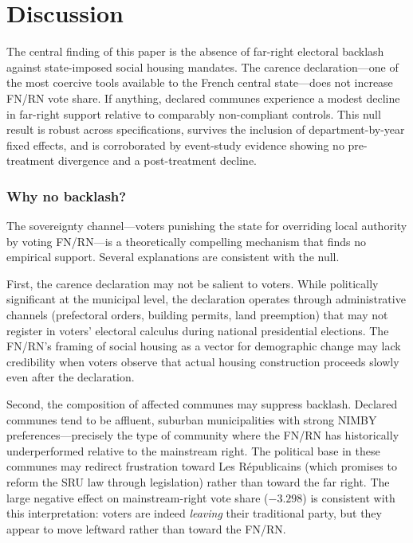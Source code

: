 \documentclass[12pt]{article}
\begin{document}
\section{Discussion}

The central finding of this paper is the absence of far-right electoral backlash against state-imposed social housing mandates. The carence declaration---one of the most coercive tools available to the French central state---does not increase FN/RN vote share. If anything, declared communes experience a modest decline in far-right support relative to comparably non-compliant controls. This null result is robust across specifications, survives the inclusion of department-by-year fixed effects, and is corroborated by event-study evidence showing no pre-treatment divergence and a post-treatment decline.

\subsubsection*{Why no backlash?} The sovereignty channel---voters punishing the state for overriding local authority by voting FN/RN---is a theoretically compelling mechanism that finds no empirical support. Several explanations are consistent with the null.

First, the carence declaration may not be salient to voters. While politically significant at the municipal level, the declaration operates through administrative channels (prefectoral orders, building permits, land preemption) that may not register in voters' electoral calculus during national presidential elections. The FN/RN's framing of social housing as a vector for demographic change may lack credibility when voters observe that actual housing construction proceeds slowly even after the declaration.

Second, the composition of affected communes may suppress backlash. Declared communes tend to be affluent, suburban municipalities with strong NIMBY preferences---precisely the type of community where the FN/RN has historically underperformed relative to the mainstream right. The political base in these communes may redirect frustration toward Les R\'{e}publicains (which promises to reform the SRU law through legislation) rather than toward the far right. The large negative effect on mainstream-right vote share ($-3.298$) is consistent with this interpretation: voters are indeed \textit{leaving} their traditional party, but they appear to move leftward rather than toward the FN/RN.
\end{document}
